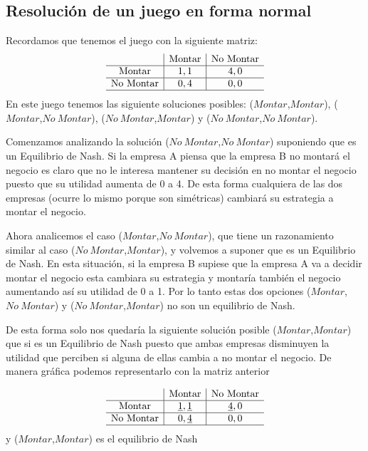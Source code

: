 \documentclass[12pt,a4paper,]{book}
\numberwithin{dummy}{section}
\theoremstyle{ocrenumbox}
\theoremstyle{blacknumex}
\theoremstyle{blacknumbox}
\theoremstyle{ocrenum}
\theoremstyle{ocrenum}
\begin{document}
\hypertarget{Seccion231}{%
\subsection{Resolución de un juego en forma normal}\label{Seccion231}}

Recordamos que tenemos el juego con la siguiente matriz: \[
\begin{array}{c|c|c}
 & \text{Montar} & \text{No Montar} \\
\hline
\text{Montar} & 1,1 & 4,0 \\
\hline
\text{No Montar} & 0,4 & 0,0 \\
\hline
\end{array}
\] En este juego tenemos las siguiente soluciones posibles:
(\(Montar\),\(Montar\)), (\(Montar\),\(No \ Montar\)),
(\(No \ Montar\),\(Montar\)) y (\(No \ Montar\),\(No \ Montar\)).

Comenzamos analizando la solución (\(No \ Montar\),\(No \ Montar\))
suponiendo que es un Equilibrio de Nash. Si la empresa A piensa que la
empresa B no montará el negocio es claro que no le interesa mantener su
decisión en no montar el negocio puesto que su utilidad aumenta de 0 a
4. De esta forma cualquiera de las dos empresas (ocurre lo mismo porque
son simétricas) cambiará su estrategia a montar el negocio.

Ahora analicemos el caso (\(Montar\),\(No \ Montar\)), que tiene un
razonamiento similar al caso (\(No \ Montar\),\(Montar\)), y volvemos a
suponer que es un Equilibrio de Nash. En esta situación, si la empresa B
supiese que la empresa A va a decidir montar el negocio esta cambiara su
estrategia y montaría también el negocio aumentando así su utilidad de 0
a 1. Por lo tanto estas dos opciones (\(Montar\),\(No \ Montar\)) y
(\(No \ Montar\),\(Montar\)) no son un equilibrio de Nash.

De esta forma solo nos quedaría la siguiente solución posible
(\(Montar\),\(Montar\)) que si es un Equilibrio de Nash puesto que ambas
empresas disminuyen la utilidad que perciben si alguna de ellas cambia a
no montar el negocio. De manera gráfica podemos representarlo con la
matriz anterior

\[
\begin{array}{c|c|c}
 & \text{Montar} & \text{No Montar} \\
\hline
\text{Montar} & \underline{1},\underline{1} & \underline{4},0 \\
\hline
\text{No Montar} & 0,\underline{4} & 0,0 \\
\hline
\end{array}
\] y (\(Montar\),\(Montar\)) es el equilibrio de Nash
\end{document}
